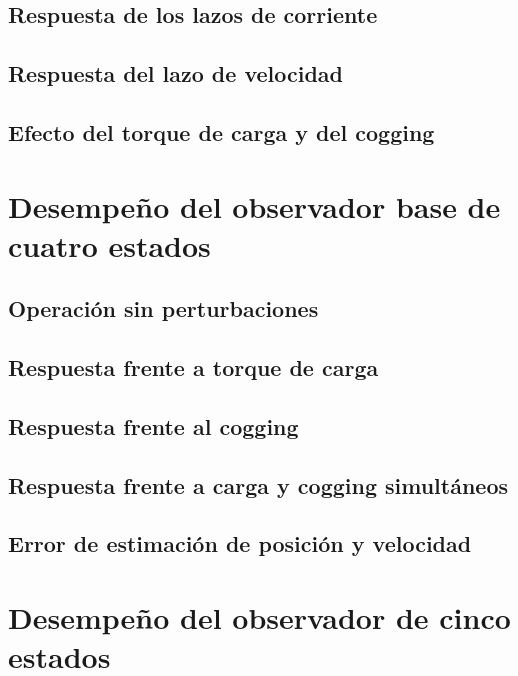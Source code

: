 \subsection{Respuesta de los lazos de corriente}

\subsection{Respuesta del lazo de velocidad}

\subsection{Efecto del torque de carga y del cogging}


\section{Desempeño del observador base de cuatro estados}

\subsection{Operación sin perturbaciones}

\subsection{Respuesta frente a torque de carga}

\subsection{Respuesta frente al cogging}

\subsection{Respuesta frente a carga y cogging simultáneos}

\subsection{Error de estimación de posición y velocidad}


\section{Desempeño del observador de cinco estados}

